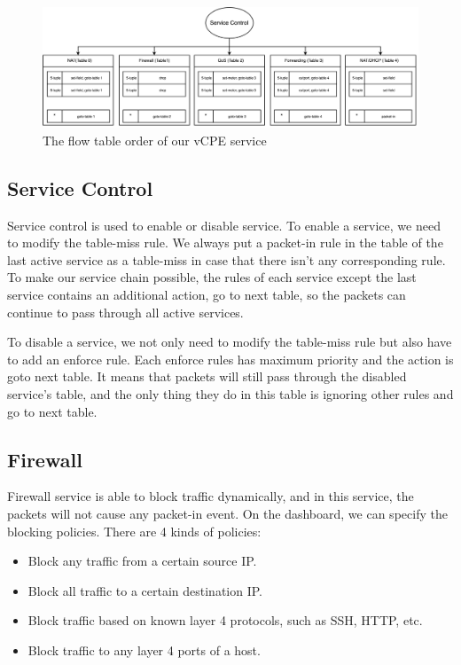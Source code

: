\documentclass[journal]{IEEEtran}
\begin{document}
\begin{figure}[!t]
\label{fig:table-seq}
\centering
\includegraphics[width=6in]{./figures/multiple_table}
\caption{The flow table order of our vCPE service}
\end{figure}


\subsection{Service Control}
Service control is used to enable or disable service. To enable a service, we need to modify the table-miss rule. We always put a packet-in rule in the table of the last active service as a table-miss in case that there isn't any corresponding rule. To make our service chain possible, the rules of each service except the last service contains an additional action, go to next table, so the packets can continue to pass through all active services.

To disable a service, we not only need to modify the table-miss rule but also have to add an enforce rule. Each enforce rules has maximum priority and the action is goto next table. It means that packets will still pass through the disabled service's table, and the only thing they do in this table is ignoring other rules and go to next table.


\subsection{Firewall}
Firewall service is able to block traffic dynamically, and in this service, the packets will not cause any packet-in event.
On the dashboard, we can specify the blocking policies. There are 4 kinds of policies:
\begin{itemize}
\item Block any traffic from a certain source IP.
\item Block all traffic to a certain destination IP.
\item Block traffic based on known layer 4 protocols, such as SSH, HTTP, etc.
\item Block traffic to any layer 4 ports of a host.
\end{itemize}
\end{document}
